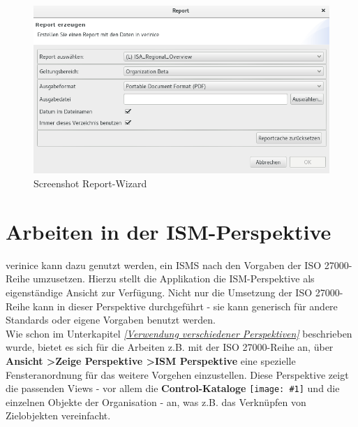 \documentclass[a4paper,10pt]{book}
\newcommand{\icon}[1]{\texttt{[image: \#1]}}
\begin{document}
\begin{figure}[htb!]
  \centering
  \includegraphics[scale=.45]{Screenshot/Report_erzeugen.png}
  \caption{Screenshot Report-Wizard}
  \label{fig:report-wizard}
\end{figure}

\chapter{Arbeiten in der ISM-Perspektive}\label{Arbeiten in der ISM-Perspektive}
verinice kann dazu genutzt werden, ein ISMS nach den Vorgaben der ISO 27000-Reihe umzusetzen. Hierzu stellt die Applikation
die ISM-Perspektive als eigenständige Ansicht zur Verfügung. Nicht nur die Umsetzung der ISO 27000-Reihe kann in dieser Perspektive
durchgeführt - sie kann generisch für andere Standards oder eigene Vorgaben benutzt werden.
\newline\\
Wie schon im Unterkapitel {\em \ref{Verwendung verschiedener Perspektiven} } beschrieben wurde, bietet es sich für die Arbeiten z.B. mit der
ISO 27000-Reihe an, über \textbf{Ansicht \textgreater Zeige Perspektive \textgreater ISM Perspektive }eine spezielle
Fensteranordnung für das weitere Vorgehen einzustellen. Diese Perspektive zeigt die passenden Views  - vor allem die
\textbf{Control-Kataloge} \icon{Icon/Control_Kataloge.png} und die einzelnen Objekte der Organisation - an,
was z.B. das Verknüpfen von Zielobjekten vereinfacht.
\end{document}

